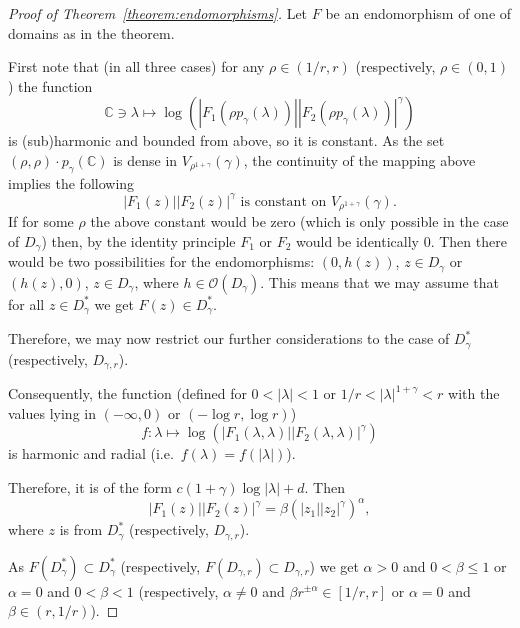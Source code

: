 \documentclass[a4paper,12pt]{amsart}
\theoremstyle{definition}
\begin{document}
\begin{proof}[Proof of Theorem~\ref{theorem:endomorphisms}]

Let $F$ be an endomorphism of one of domains as in the theorem.


First note that (in all three cases) for any $\rho\in(1/r,r)$ (respectively, $\rho\in (0,1)$) the function
\begin{equation}
    \mathbb C\owns\lambda \mapsto \log(|F_1(\rho p_{\gamma}(\lambda))||F_2(\rho p_{\gamma}(\lambda))|^{\gamma})
\end{equation}
is (sub)harmonic and bounded from above, so it is constant. As the set $(\rho,\rho)\cdot p_{\gamma}(\mathbb C)$ is dense in $V_{\rho^{1+\gamma}}(\gamma)$, the continuity of the mapping above implies the following
\begin{equation}
|F_1(z)||F_2(z)|^{\gamma} \text{ is constant on $V_{\rho^{1+\gamma}}(\gamma)$}.
\end{equation}
If for some $\rho$ the above constant would be zero (which is only possible in the case of $D_{\gamma}$) then, by the identity principle $F_1$ or $F_2$ would be identically $0$. Then there would be two possibilities for the endomorphisms:
$(0,h(z))$, $z\in D_{\gamma}$ or $(h(z),0)$, $z\in D_{\gamma}$, where $h\in\mathcal O(D_{\gamma})$. This means that we may assume that for all $z\in D_{\gamma}^*$ we get
$F(z)\in D_{\gamma}^*$.

Therefore, we may now restrict our further considerations to the case of $D_{\gamma}^*$ (respectively, $D_{\gamma,r}$).

Consequently, the function (defined for $0<|\lambda|<1$ or $1/r<|\lambda|^{1+\gamma}<r$ with the values lying in $(-\infty,0)$ or $(-\log r,\log r)$)
\begin{equation}
    f \colon \lambda \mapsto \log(|F_1(\lambda,\lambda)||F_2(\lambda,\lambda)|^{\gamma})
\end{equation}
is harmonic and radial (i.e.\ $f(\lambda)=f(|\lambda|)$). 

Therefore, it is of the form $c(1+\gamma)\log|\lambda|+d$. Then
\begin{equation}    |F_1(z)||F_2(z)|^{\gamma}=\beta(|z_1||z_2|^{\gamma})^{\alpha},
\end{equation}
where $z$ is from $D_{\gamma}^*$ (respectively, $D_{\gamma,r}$).

As $F(D_{\gamma}^*)\subset D_{\gamma}^*$ (respectively, $F(D_{\gamma,r})\subset D_{\gamma,r}$) we get $\alpha>0$ and $0<\beta\leq 1$ or $\alpha=0$ and $0<\beta<1$ (respectively, $\alpha\neq 0$ and $\beta r^{\pm\alpha}\in[1/r,r]$ or $\alpha=0$ and $\beta\in(r,1/r)$).


\end{proof}
\end{document}
